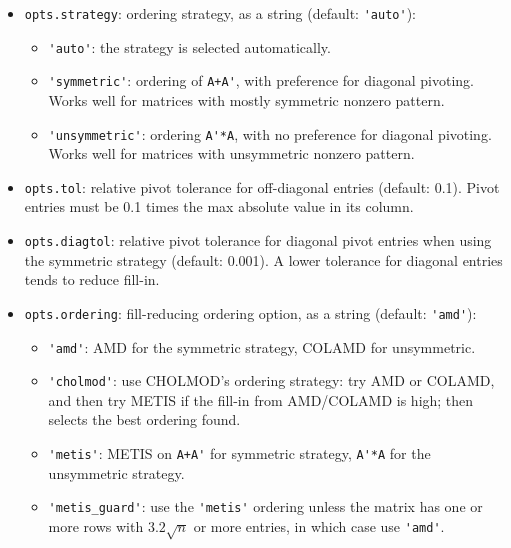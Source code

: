 \documentclass[12pt]{article}
\begin{document}
\begin{itemize}

    \item \verb'opts.strategy':  ordering strategy,
        as a string (default: \verb"'auto'"):

        \begin{itemize}
        \item \verb"'auto'": the strategy is selected automatically.
        \item \verb"'symmetric'": ordering of \verb"A+A'", with preference for
            diagonal pivoting.  Works well for matrices with mostly symmetric
            nonzero pattern.
        \item \verb"'unsymmetric'": ordering \verb"A'*A", with no preference
            for diagonal pivoting.  Works well for matrices with unsymmetric
            nonzero pattern.
        \end{itemize}

    \item \verb'opts.tol':   relative pivot tolerance for off-diagonal entries
    (default: 0.1).  Pivot entries must be 0.1 times the max absolute value in
    its column.

    \item \verb'opts.diagtol':   relative pivot tolerance for diagonal pivot
    entries when using the symmetric strategy (default: 0.001).  A lower
    tolerance for diagonal entries tends to reduce fill-in.

    \item \verb'opts.ordering':  fill-reducing ordering option, as a string
    (default: \verb"'amd'"):

        \begin{itemize}
        \item \verb"'amd'": AMD for the symmetric strategy, COLAMD for
        unsymmetric.

        \item \verb"'cholmod'": use CHOLMOD's ordering strategy: try AMD or
        COLAMD, and then try METIS if the fill-in from AMD/COLAMD is high; then
        selects the best ordering found.

        \item \verb"'metis'": METIS on \verb"A+A'" for symmetric strategy,
            \verb"A'*A" for the unsymmetric strategy.

        \item \verb"'metis_guard'": use the \verb"'metis'" ordering unless the
        matrix has one or more rows with $3.2\sqrt{n}$ or more entries, in
        which case use \verb"'amd'".


\end{itemize}
\end{itemize}
\end{document}
